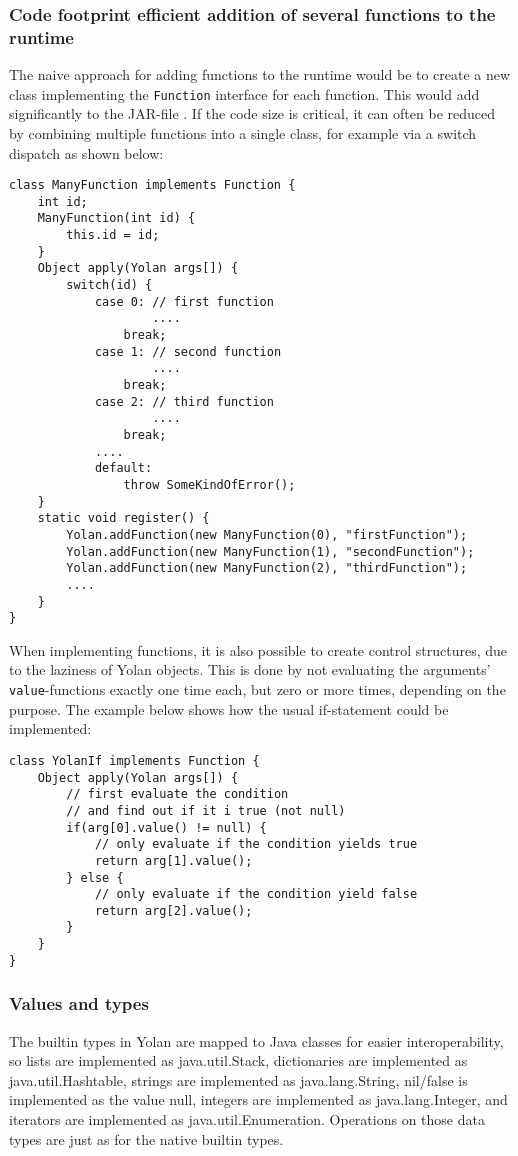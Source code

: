 \documentclass[11pt]{report}
\begin{document}
\subsubsection{Code footprint efficient addition of several functions to the runtime}
The naive approach for adding functions to the runtime would be to create a new class implementing the \verb|Function| interface for each function. This would add significantly to the JAR-file
.
If the code size is critical, it can often be reduced by combining multiple functions into a single class, for example via a switch dispatch as shown below:
\begin{lstlisting}
class ManyFunction implements Function {
    int id;
    ManyFunction(int id) {
        this.id = id;
    }
    Object apply(Yolan args[]) {
        switch(id) {
            case 0: // first function
                    ....
                break;
            case 1: // second function
                    ....
                break;
            case 2: // third function
                    ....
                break;
            ....
            default:
                throw SomeKindOfError();
    }
    static void register() {
        Yolan.addFunction(new ManyFunction(0), "firstFunction");
        Yolan.addFunction(new ManyFunction(1), "secondFunction");
        Yolan.addFunction(new ManyFunction(2), "thirdFunction");
        ....
    }
}
\end{lstlisting}

When implementing functions, it is also possible to create control structures, due to the laziness of Yolan objects. This is done by not evaluating the arguments' \verb|value|-functions exactly one time each, but zero or more times, depending on the purpose. The example below shows how the usual if-statement could be implemented:
\begin{lstlisting}
class YolanIf implements Function {
    Object apply(Yolan args[]) {
        // first evaluate the condition
        // and find out if it i true (not null)
        if(arg[0].value() != null) {
            // only evaluate if the condition yields true
            return arg[1].value();
        } else {
            // only evaluate if the condition yield false
            return arg[2].value();
        }
    }
}
\end{lstlisting}
\subsubsection{Values and types}
The builtin types in Yolan are mapped to Java classes for easier interoperability,
so lists are implemented as java.util.Stack, dictionaries are implemented as java.util.Hashtable, strings are implemented as java.lang.String, nil/false is implemented as the value null, integers are implemented as java.lang.Integer, and iterators are implemented as java.util.Enumeration. 
Operations on those data types are just as for the native builtin types. 
\end{document}

